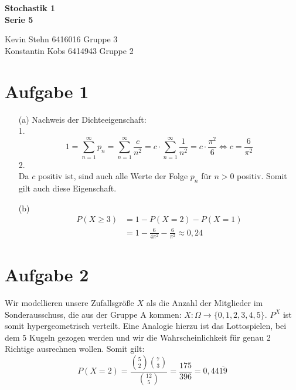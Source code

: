\documentclass[10pt,a4paper]{article}
\begin{document}
\begin{center}
\textbf{Stochastik 1 \\ Serie 5 \\}
\end{center}

\begin{flushright}
Kevin Stehn 6416016 Gruppe 3 \\
Konstantin Kobs 6414943 Gruppe 2
\end{flushright}

\section*{Aufgabe 1}
\begin{itemize}
\item[(a)]Nachweis der Dichteeigenschaft:\\
1.
$$1 = \sum_{n=1}^\infty p_n = \sum_{n=1}^\infty \frac{c}{n^2} = c \cdot \sum_{n=1}^\infty \frac{1}{n^2} = c \cdot \frac{\pi^2}{6} \Leftrightarrow c = \frac{6}{\pi^2}$$
2.\\
Da $c$ positiv ist, sind auch alle Werte der Folge $p_n$ für $n > 0$ positiv. Somit gilt auch diese Eigenschaft.
\item[(b)]
\begin{align*}
P(X \geq 3) &= 1 - P(X = 2) - P(X = 1)\\
&= 1 - \frac{6}{4\pi^2} - \frac{6}{\pi^2} \approx 0,24
\end{align*}
\end{itemize}

\section*{Aufgabe 2}
Wir modellieren unsere Zufallsgröße $X$ als die Anzahl der Mitglieder im Sonderausschuss, die aus der Gruppe A kommen: $X : \Omega \rightarrow \{0,1,2,3,4,5\}$. $P^X$ ist somit hypergeometrisch verteilt. Eine Analogie hierzu ist das Lottospielen, bei dem 5 Kugeln gezogen werden und wir die Wahrscheinlichkeit für genau 2 Richtige ausrechnen wollen. Somit gilt:
$$P(X = 2) = \frac{\binom{5}{2} \binom{7}{3}}{\binom{12}{5}} = \frac{175}{396} = 0,44\overline{19}$$
\end{document}
